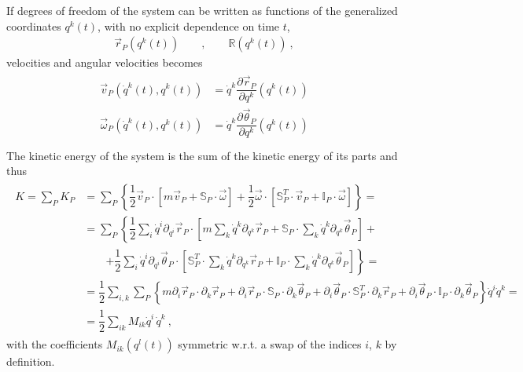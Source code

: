 \documentclass[letterpaper,10pt,english]{jupyterBook}
\begin{document}
\sphinxAtStartPar
If degrees of freedom of the system can be written as functions of  the generalized coordinates \(q^k(t)\), with no explicit dependence on time \(t\),
\begin{equation*}
\begin{split}\vec{r}_P\left( q^k(t)\right) \qquad , \qquad \mathbb{R}\left( q^k(t) \right) \ ,\end{split}
\end{equation*}
\sphinxAtStartPar
velocities and angular velocities becomes
\begin{equation*}
\begin{split}\begin{aligned}
       \vec{v}_P\left( \dot{q}^k(t), q^k(t) \right) & = \dot{q}^k \dfrac{\partial \vec{r}_P}{\partial q^k}\left( q^k(t) \right) \\
  \vec{\omega}_P\left( \dot{q}^k(t), q^k(t) \right) & = \dot{q}^k \dfrac{\partial \vec{\theta}_P}{\partial q^k}\left( q^k(t) \right) \\
\end{aligned}\end{split}
\end{equation*}
\sphinxAtStartPar
The kinetic energy of the system is the sum of the kinetic energy of its parts and thus
\begin{equation*}
\begin{split}\begin{aligned}
  K = \sum_P K_P 
  & = \sum_P \left\{ \dfrac{1}{2} \vec{v}_P \cdot \left[ m \vec{v}_P + \mathbb{S}_P \cdot \vec{\omega} \right] 
                   + \dfrac{1}{2} \vec{\omega} \cdot \left[ \mathbb{S}_P^T \cdot \vec{v}_P + \mathbb{I}_P \cdot \vec{\omega} \right]  \right\} = \\
  & = \sum_P \left\{ \dfrac{1}{2} \sum_i \dot{q}^i \partial_{q^i} \vec{r}_P \cdot \left[ m \sum_k \dot{q}^k \partial_{q^k} \vec{r}_P + \mathbb{S}_P \cdot \sum_k \dot{q}^k \partial_{q^k} \vec{\theta}_P \right] \right. + \\ 
  &  \qquad \left. + \dfrac{1}{2} \sum_i \dot{q}^i \partial_{q^i} \vec{\theta}_P  \cdot \left[ \mathbb{S}_P^T \cdot \sum_k \dot{q}^k \partial_{q^k} \vec{r}_P + \mathbb{I}_P \cdot \sum_k \dot{q}^k \partial_{q^k} \vec{\theta}_P \right]  \right\} = \\
  & = \dfrac{1}{2} \sum_{i,k} \sum_P \left\{ m \partial_i \vec{r}_P \cdot \partial_k \vec{r}_P + \partial_i \vec{r}_P \cdot \mathbb{S}_P \cdot \partial_k \vec{\theta}_P + \partial_i \vec{\theta}_P \cdot \mathbb{S}_P^T \cdot \partial_k \vec{r}_P + \partial_i \vec{\theta}_P \cdot \mathbb{I}_P \cdot \partial_k \vec{\theta}_P  \right\} \dot{q}^i \dot{q}^k = \\
  & = \dfrac{1}{2} \sum_{ik} M_{ik} \dot{q}^i \, \dot{q}^k \ ,
\end{aligned}\end{split}
\end{equation*}
\sphinxAtStartPar
with the coefficients \(M_{ik}(q^l(t))\) symmetric w.r.t. a swap of the indices \(i\), \(k\) by definition.
\end{document}
